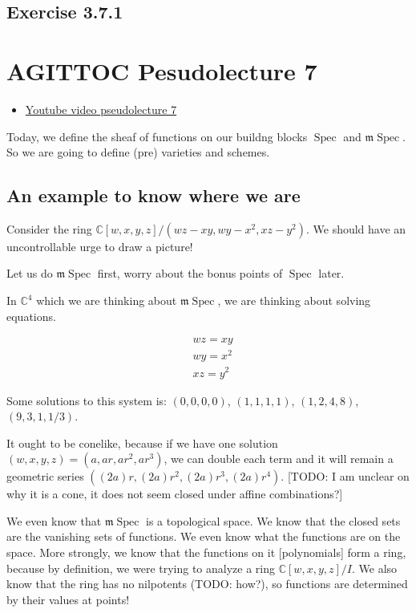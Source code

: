 \documentclass{book}
\newcommand{\C}{\ensuremath{\mathbb{C}}}
\newcommand{\Spec}{\operatorname{Spec}}
\newcommand{\m}{\mathfrak{m}}
\newcommand{\mSpec}{\m\operatorname{Spec}}
\theoremstyle{definition}
\begin{document}
\section{Exercise 3.7.1} 

\chapter{AGITTOC  Pesudolecture 7}
\begin{itemize}
\item \href{https://www.youtube.com/watch?v=4KJwmiYHVk4}{Youtube video pseudolecture 7}
\end{itemize}

Today, we define the sheaf of functions on our buildng blocks $\Spec$ and $\mSpec$.
So we are going to define (pre) varieties and schemes.

\section{An example to know where we are}
Consider the ring $\C[w, x, y, z]/(wz - xy, wy - x^2, xz - y^2)$. We should
have an uncontrollable urge to draw a picture! 

Let us do $\mSpec$ first, worry about the bonus points of $\Spec$ later.

In $\C^4$ which we are thinking about $\mSpec$, we are thinking about
solving equations.

\begin{align*}
&wz = xy \\
&wy = x^2 \\
&xz = y^2
\end{align*}

Some solutions to this system is:
$(0, 0, 0, 0)$, $(1, 1, 1, 1)$, $(1, 2, 4, 8)$, $(9, 3, 1, 1/3)$.

It ought to be conelike, because if we have one solution $(w, x, y, z) = (a, ar, ar^2, ar^3)$, 
we can double each term and it will remain a geometric series $((2a)r, (2a)r^2, (2a)r^3, (2a)r^4)$.
[TODO: I am unclear on why it is a cone, it does not seem closed under affine combinations?]


We even know that $\mSpec$ is a topological space. We know that the closed sets
are the vanishing sets of functions. We even know what the functions are on
the space. More strongly, we know that the functions on it [polynomials]
form a ring, because by definition, we were trying to analyze a ring
$\C[w, x, y, z]/I$. We also know that the ring has no nilpotents (TODO: how?),
so functions are determined by their values at points!                                                    
\end{document}
